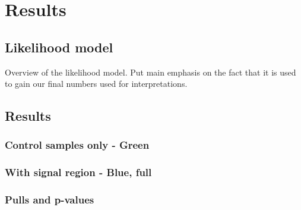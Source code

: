\chapter{Results}

\ifpdf
    \graphicspath{{Chapter8/Figs/Raster/}{Chapter8/Figs/PDF/}{Chapter8/Figs/}}
\else
    \graphicspath{{Chapter8/Figs/Vector/}{Chapter8/Figs/}}
\fi

\section{Likelihood model}  %
\label{sec:results_likelihood}
Overview of the likelihood model.
Put main emphasis on the fact that it is used to gain our final numbers used for
interpretations.


\section{Results}  %
\label{sec:results_results}

\subsection{Control samples only - Green}

\subsection{With signal region - Blue, full}

\subsection{Pulls and p-values}

